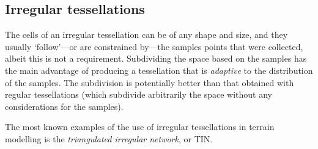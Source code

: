 \subsection{Irregular tessellations} 

The cells of an irregular tessellation can be of any shape and size, and they usually `follow'---or are constrained by---the samples points that were collected, albeit this is not a requirement. 
Subdividing the space based on the samples has the main advantage of producing a tessellation that is \emph{adaptive} to the distribution of the samples. 
The subdivision is potentially better than that obtained with regular tessellations (which subdivide arbitrarily the space without any considerations for the samples).

%

The most known examples of the use of irregular tessellations in terrain modelling is the \emph{triangulated irregular network}, or TIN\@.%

